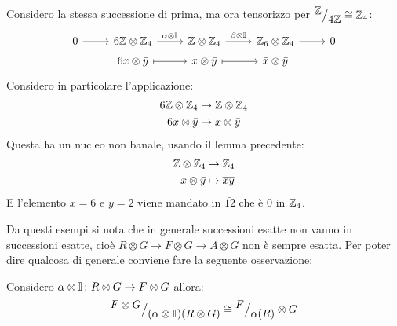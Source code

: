 \begin{example}
  Considero la stessa successione di prima, ma ora tensorizzo per $ {^{\textstyle \mathbb{Z}}\big/_{\textstyle 4 \mathbb{Z}}}  \cong \mathbb{Z}_4 $:
  \[
    \begin{tikzcd}[nodes = {row sep = 3pt}]
      0 \rar{} & 6 \Z \otimes \Z_4 \rar{\alpha \otimes \Id{}} & \Z \otimes \Z_4 \rar{\beta \otimes \Id{}} & \Z_6 \otimes \Z_4 \rar & 0 \\
      {}  & 6x \otimes \bar{y} \rar[mapsto] & x \otimes \bar{y} \rar[mapsto] & \bar{x} \otimes \bar{y}
    \end{tikzcd}
  \]
  Considero in particolare l'applicazione:
  \begin{align*}
    6 \mathbb{Z} \otimes \mathbb{Z}_4 & \to \mathbb{Z} \otimes \mathbb{Z}_4 \\
    6 x \otimes \bar{y} & \mapsto x \otimes \bar{y}
  \end{align*}
  Questa ha un nucleo non banale, usando il lemma
  precedente:
  \begin{align*}
    \mathbb{Z} \otimes \mathbb{Z}_4 & \to \mathbb{Z}_4 \\
     x \otimes \bar{y} & \mapsto \overline{xy}
  \end{align*}
  E l'elemento $ x = 6 $ e $ y = 2 $ viene mandato in $ \bar{12} $ che è $ 0 $ in $ \mathbb{Z}_4 $.

\end{example}
Da questi esempi si nota che in generale successioni esatte non vanno in successioni esatte,
cioè $ R \otimes G \to F \otimes G \to A \otimes G $ non è sempre esatta. Per poter dire qualcosa di generale conviene
fare la seguente osservazione:
\begin{osservation}
Considero $ \alpha \otimes \mathbb{I}_{} \colon R \otimes G \to F \otimes G $ allora:
\[
  {^{\textstyle F \otimes G}\big/_{\textstyle (\alpha \otimes \mathbb{I}_{})(R \otimes G)}} \cong {^{\textstyle F}\big/_{\textstyle \alpha(R)}} \otimes G
\]
\end{osservation}
